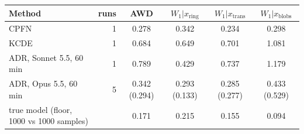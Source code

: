\begin{tabular}{@{}lrcccc@{}}
\toprule
Method & runs & AWD & $W_1|x_\mathrm{ring}$ & $W_1|x_\mathrm{trans}$ & $W_1|x_\mathrm{blobs}$ \\
\midrule
CPFN & 1 & 0.278 & 0.342 & 0.234 & 0.298 \\
KCDE & 1 & 0.684 & 0.649 & 0.701 & 1.081 \\
\rowcolor{agent}ADR, Sonnet 5.5, 60 min & 1 & 0.789 & 0.429 & 0.737 & 1.179 \\
\rowcolor{agent}ADR, Opus 5.5, 60 min & 5 & 0.342 (0.294) & 0.293 (0.133) & 0.285 (0.277) & 0.433 (0.529) \\
true model (floor, 1000 vs 1000 samples) &  & 0.171 & 0.215 & 0.155 & 0.094 \\
\bottomrule
\end{tabular}
